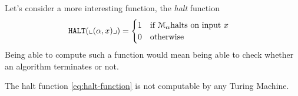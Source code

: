 Let's consider a more interesting function, the \emph{halt} function
\begin{equation}
	\HALT(\enc{(\alpha, x)}) =
	\begin{cases}
		1 \quad \text{if } \mathcal{M}_{\alpha} \text{halts on input } x \\
		0 \quad \text{otherwise}
	\end{cases}
	\label{eq:halt-function}
\end{equation}
Being able to compute such a function would mean being able to check whether an algorithm terminates or not.

\begin{theorem}
	The halt function \ref{eq:halt-function} is not computable by any Turing Machine.
	\label{thm:halt-uncomputability}
\end{theorem}
